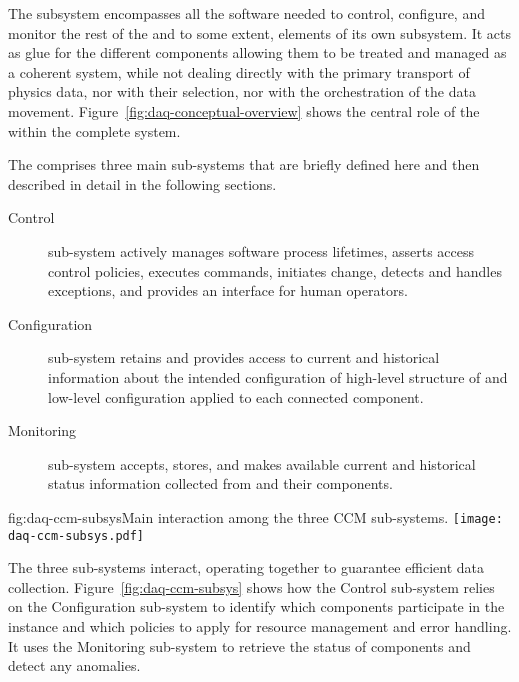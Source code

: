 The  subsystem encompasses all the software needed to control, configure, and monitor the rest of the  and to some extent, elements of its own subsystem. 
It acts as glue for the different  components allowing them to be treated and managed as a coherent system, while not dealing directly with the primary transport of physics data, nor with their selection, nor with the orchestration of the data movement. 
Figure~\ref{fig:daq-conceptual-overview} shows the central role of the  within the complete  system.

The  comprises three main sub-systems that are briefly defined here and then described in detail in the following sections.
\begin{description}

\item[Control] sub-system actively manages  software process lifetimes, asserts access control policies, executes commands, initiates change, detects and handles exceptions, and provides an interface for human operators.


\item[Configuration] sub-system retains and provides access to current and historical information about the intended configuration of high-level structure of  and low-level configuration applied to each connected component.

\item[Monitoring] sub-system accepts, stores, and makes available current and historical status information collected from  and their components.

\end{description}

\begin{dunefigure}{fig:daq-ccm-subsys}{Main interaction among the three CCM sub-systems.}
  \texttt{[image: daq-ccm-subsys.pdf]}
\end{dunefigure}

The three  sub-systems interact, operating together to guarantee efficient data collection.  Figure~\ref{fig:daq-ccm-subsys} shows how the Control sub-system relies on the Configuration sub-system to identify which components participate in the  instance and which policies to apply for resource management and error handling. It uses the Monitoring sub-system to retrieve the status of  components and detect any anomalies.

